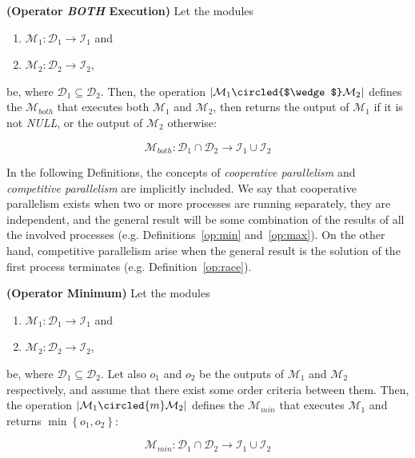 
\begin{definition}\label{op:and}
{\bf (Operator {\it BOTH} Execution)} Let the modules
\begin{enumerate}%
	\item $\mathcal{M}_1 : \mathcal{D}_1 \rightarrow \mathcal{I}_1$ and  
	\item $\mathcal{M}_2 : \mathcal{D}_2 \rightarrow \mathcal{I}_2$,
\end{enumerate}%
be, where $\mathcal{D}_1 \subseteq \mathcal{D}_2$. %
Then, the operation $\left|\mathcal{M}_1\circled{$\wedge$}\mathcal{M}_2\right|$ defines the \cm{} $\mathcal{M}_{both}$ that executes both $\mathcal{M}_1$ and $\mathcal{M}_2$, then returns the output of $\mathcal{M}_1$ if it is not {\it NULL}, or the output of $\mathcal{M}_2$ otherwise:

\[
\mathcal{M}_{both}:\mathcal{D}_1\cap\mathcal{D}_2 \rightarrow \mathcal{I}_1 \cup \mathcal{I}_2 
\]
\end{definition}

In the following Definitions, the concepts of {\it cooperative parallelism} and {\it competitive parallelism} are implicitly included. We say that cooperative parallelism exists when two or more processes are running separately, they are independent, and the general result will be some combination of the results of all the involved processes (e.g. Definitions~\ref{op:min} and~\ref{op:max}). On the other hand, competitive parallelism arise when the general result is the solution of the first process terminates (e.g. Definition~\ref{op:race}).

\begin{definition}\label{op:min}
{\bf (Operator Minimum)} Let the modules
\begin{enumerate}%
	\item $\mathcal{M}_1 : \mathcal{D}_1 \rightarrow \mathcal{I}_1$ and  
	\item $\mathcal{M}_2 : \mathcal{D}_2 \rightarrow \mathcal{I}_2$,
\end{enumerate}%
be, where $\mathcal{D}_1 \subseteq \mathcal{D}_2$. %
Let also $o_1$ and $o_2$ be the outputs of $\mathcal{M}_1$ and $\mathcal{M}_2$ respectively, and assume that there exist some order criteria between them. Then, the operation $\left|\mathcal{M}_1\circled{m}\mathcal{M}_2\right|$ defines the \cm{} $\mathcal{M}_{min}$ that executes $\mathcal{M}_1$ and returns $\min\left\{o_1,o_2\right\}$:

\[
\mathcal{M}_{min}:\mathcal{D}_1\cap\mathcal{D}_2 \rightarrow \mathcal{I}_1 \cup \mathcal{I}_2 
\]
\end{definition}

